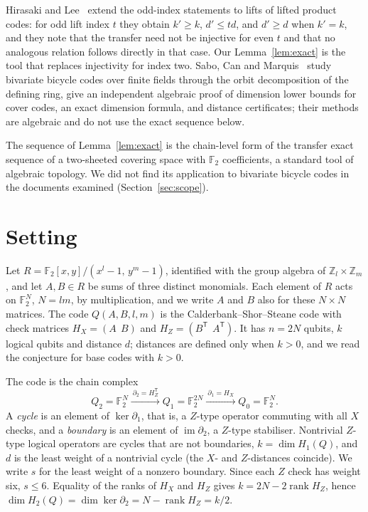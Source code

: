 \documentclass[11pt,a4paper]{article}
\theoremstyle{definition}
\theoremstyle{plain}
\DeclareMathOperator{\im}{im}
\DeclareMathOperator{\rank}{rank}
\newcommand{\F}{\mathbb{F}_2}
\newcommand{\Z}{\mathbb{Z}}
\newcommand{\T}{\mathsf{T}}
\begin{document}
Hirasaki and Lee~\cite{Hirasaki2026} extend the odd-index statements to lifts
of lifted product codes: for odd lift index $t$ they obtain $k'\ge k$,
$d'\le td$, and $d'\ge d$ when $k'=k$, and they note that the transfer need
not be injective for even $t$ and that no analogous relation follows directly
in that case. Our Lemma~\ref{lem:exact} is the tool that replaces injectivity
for index two. Sabo, Can and Marquis~\cite{Sabo2026} study bivariate bicycle
codes over finite fields through the orbit decomposition of the defining
ring, give an independent algebraic proof of dimension lower bounds for cover
codes, an exact dimension formula, and distance certificates; their methods
are algebraic and do not use the exact sequence below.

The sequence of Lemma~\ref{lem:exact} is the chain-level form of the transfer
exact sequence of a two-sheeted covering space with $\F$ coefficients, a
standard tool of algebraic topology. We did not find its application to
bivariate bicycle codes in the documents examined (Section~\ref{sec:scope}).

\section{Setting}\label{sec:setting}
Let $R=\F[x,y]/(x^l-1,\,y^m-1)$, identified with the group algebra of
$\Z_l\times\Z_m$, and let $A,B\in R$ be sums of three distinct monomials.
Each element of $R$ acts on $\F^{N}$, $N=lm$, by multiplication, and we write
$A$ and $B$ also for these $N\times N$ matrices. The code $Q(A,B,l,m)$ is the
Calderbank--Shor--Steane code with check matrices $H_X=(A\ \ B)$ and
$H_Z=(B^\T\ \ A^\T)$. It has $n=2N$ qubits, $k$ logical qubits and distance
$d$; distances are defined only when $k>0$, and we read the conjecture for
base codes with $k>0$.

The code is the chain complex
\[
Q_2=\F^{N}\xrightarrow{\ \partial_2=H_Z^\T\ }Q_1=\F^{2N}
\xrightarrow{\ \partial_1=H_X\ }Q_0=\F^{N}.
\]
A \emph{cycle} is an element of $\ker\partial_1$, that is, a $Z$-type
operator commuting with all $X$ checks, and a \emph{boundary} is an element of
$\im\partial_2$, a $Z$-type stabiliser. Nontrivial $Z$-type logical operators
are cycles that are not boundaries, $k=\dim H_1(Q)$, and $d$ is the least
weight of a nontrivial cycle (the $X$- and $Z$-distances coincide). We write
$s$ for the least weight of a nonzero boundary. Since each $Z$ check has
weight six, $s\le6$. Equality of the ranks of $H_X$ and $H_Z$ gives
$k=2N-2\rank H_Z$, hence $\dim H_2(Q)=\dim\ker\partial_2=N-\rank H_Z=k/2$.
\end{document}
